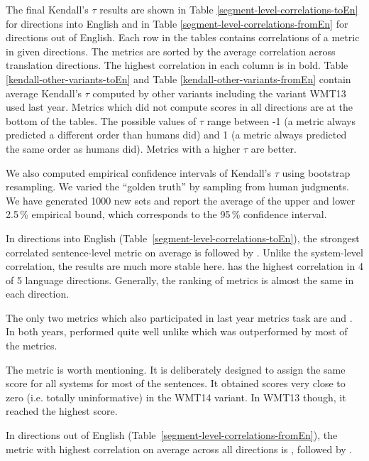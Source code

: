 \afterpage{\clearpage}




The final Kendall's $\tau$ results are shown in Table
\ref{segment-level-correlations-toEn} for directions into English and in Table
\ref{segment-level-correlations-fromEn} for directions out of English.  Each
row in the tables contains correlations of a metric in given directions. The
metrics are sorted by the average correlation across translation directions.  The
highest correlation in each column is in bold. Table
\ref{kendall-other-variants-toEn} and Table \ref{kendall-other-variants-fromEn}
contain average Kendall's $\tau$ computed by other variants including the
variant WMT13 used last year.  Metrics which did not compute scores in all
directions are at the bottom of the tables. The possible values of $\tau$ range
between -1 (a metric always predicted a different order than humans did) and 1
(a metric always predicted the same order as humans did). Metrics with a higher
$\tau$ are better.

We also computed empirical confidence intervals of Kendall's $\tau$ using bootstrap
resampling. We varied the ``golden truth'' by sampling from human judgments. We
have generated 1000 new sets and report the average of the upper and lower
2.5\,\% empirical bound, which corresponds to the 95\,\% confidence interval.




In directions into English (Table~\ref{segment-level-correlations-toEn}), the
strongest correlated sentence-level metric on average is
 followed by . Unlike the system-level
correlation, the results are much more stable here.
 has the highest correlation in 4 of 5 language
directions. Generally, the ranking of metrics is almost the same in each
direction. 

The only two metrics which also participated in last year metrics task are
 and . In both years,  performed
quite well unlike  which was outperformed by most of the
metrics. 

The metric  is worth mentioning.  It is deliberately
designed to assign the same score for all systems for most of the sentences.  It
obtained scores very close to zero (i.e. totally uninformative) in the WMT14
variant.  In WMT13 though, it reached the highest score.

In directions out of English (Table~\ref{segment-level-correlations-fromEn}),
the metric with highest correlation on average across all directions is
, followed by .

